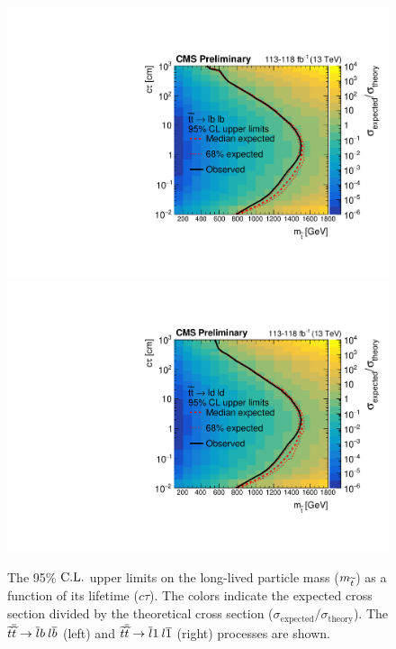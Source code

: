 \begin{figure}[hbtp]
\centering
\includegraphics[scale=0.39]{figures/results/2DlimitsCombinedStopToLB.pdf}
\includegraphics[scale=0.39]{figures/results/2DlimitsCombinedStopToLD.pdf}
\caption{The 95\% $\text{C.L.}$ upper limits on the long-lived particle mass ($m_{\widetilde{t}}$) as a function of its lifetime ($c\tau$). The colors indicate the expected cross section divided by the theoretical cross section ($\sigma_\text{expected}/\sigma_\text{theory}$). The $\widetilde{t}\overline{\widetilde{t}} \to \overline{l}b\:l\overline{b} $ (left) and $\widetilde{t}\overline{\widetilde{t}} \to \overline{l}1\:l\overline{1}$ (right) processes are shown.} 
\label{limits_combined}
\end{figure}